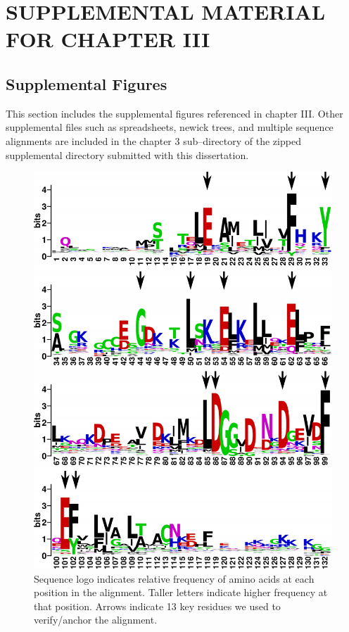 \chapter{SUPPLEMENTAL MATERIAL FOR CHAPTER III}

\section{Supplemental Figures}
This section includes the supplemental figures referenced in chapter III. Other supplemental files such as spreadsheets, newick trees, and multiple sequence alignments are included in the chapter 3 sub--directory of the zipped supplemental directory submitted with this dissertation. 

\begin{figure}
\centering
	\includegraphics{ch3-FigS1.png} 
\caption[Sequence logos of S100 multiple sequence alignment]{Sequence logo indicates relative frequency of amino acids at each position in the alignment. Taller letters indicate higher frequency at that position. Arrows indicate 13 key residues we used to verify/anchor the alignment.\label{samplefigure}}	
\end{figure}

